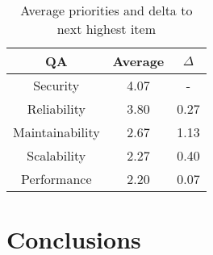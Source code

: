 \documentclass[utf8,english]{gradu3}
\begin{document}
\begin{table}[!h]
  \begin{center}
    \caption{Average priorities and delta to next highest item}
    \label{table:priorities3}
    \begin{tabular}{|c|c|c|}
      \hline
      \textbf{QA} & \textbf{Average} & \textbf{$\Delta$} \\
      \hline
      Security        & 4.07 & -   \\
      Reliability     & 3.80 & 0.27\\
      Maintainability & 2.67 & 1.13\\
      Scalability     & 2.27 & 0.40\\
      Performance     & 2.20 & 0.07\\
      \hline
    \end{tabular}
  \end{center}
\end{table}

\chapter{Conclusions}


\printbibliography

\nocite{*}

\appendix
\end{document}
